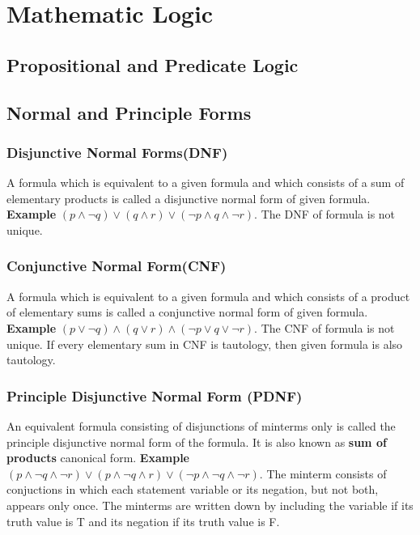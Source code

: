 \section{Mathematic Logic}

\subsection{Propositional and Predicate Logic}

\subsection{Normal and Principle Forms}

\subsubsection{Disjunctive Normal Forms(DNF)}
A formula which is equivalent to a given formula and which consists of a
sum of elementary products is called a disjunctive normal form of given
formula. \textbf{Example} $ (p \land \neg q) \lor (q \land r) \lor (\neg
p \land q \land \neg r) $. The DNF of formula is not unique.

\subsubsection{Conjunctive Normal Form(CNF)}
A formula which is equivalent to a given formula and which consists of a
product of elementary sums is called a conjunctive normal form of given
formula. \textbf{Example} $ (p \lor \neg q) \land (q \lor r) \land (\neg
p \lor q \lor \neg r) $. The CNF of formula is not unique. If every
elementary sum in CNF is tautology, then given formula is also
tautology.

\subsubsection{Principle Disjunctive Normal Form (PDNF)}
An equivalent formula consisting of disjunctions of minterms only is
called the principle disjunctive normal form of the formula. It is also
known as \textbf{sum of products} canonical form. \textbf{Example} $ (p
\land \neg q \land \neg r) \lor (p \land \neg q \land r) \lor ( \neg p
\land \neg q \land \neg r) $. The minterm consists of conjuctions in
which each statement variable or its negation, but not both, appears
only once. The minterms are written down by including the variable if
its truth value is T and its negation if its truth value is F.

